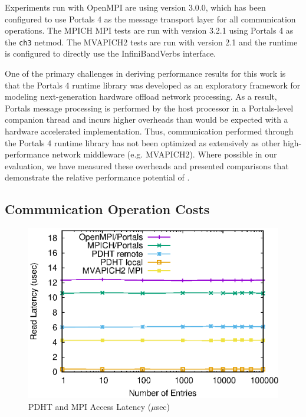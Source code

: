 
Experiments run with OpenMPI are using version 3.0.0, which has been configured
to use Portals 4 as the message transport layer for all communication
operations. The MPICH MPI tests are run with version 3.2.1 using Portals 4 as
the {\tt ch3} netmod. The MVAPICH2 tests are run with version 2.1 and the
runtime is configured to directly use the InfiniBand\othertm Verbs interface.

One of the primary challenges in deriving performance results for this work is
that the Portals 4 runtime library was developed as an exploratory framework
for modeling next-generation hardware offload network processing. As a result,
Portals message processing is performed by the host processor in a Portals-level companion thread and
incurs higher overheads than would be expected with a hardware accelerated
implementation. Thus, communication performed through the Portals 4 runtime
library has not been optimized as extensively as other high-performance network
middleware (e.g. MVAPICH2). Where possible in our evaluation, we have measured
these overheads and presented comparisons that demonstrate the relative
performance potential of \pdht.






\subsection{Communication Operation Costs}

\begin{figure}
  \centering
  \includegraphics[width=.9\linewidth]{plots/mpilatency}
  \caption{PDHT and MPI Access Latency ($\mu$sec)}
  \label{fig:all-latency}
\end{figure}


